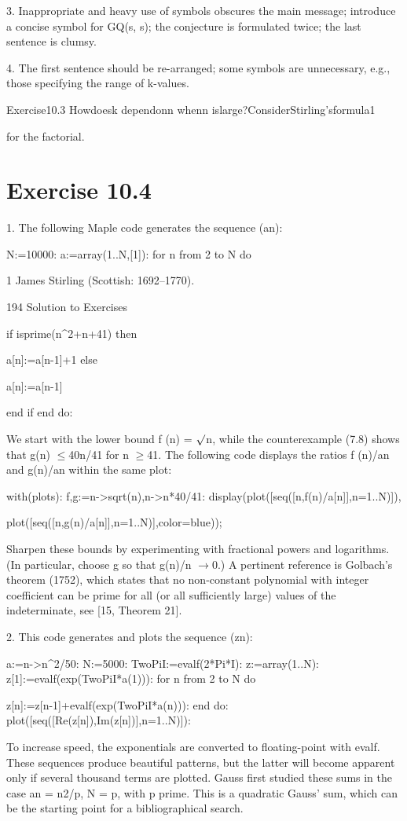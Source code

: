 \documentclass[11pt]{article}
\theoremstyle{plain}
\theoremstyle{definition}
\begin{document}
3. Inappropriate and heavy use of symbols obscures the main message; introduce a concise symbol for GQ(s, s); the conjecture is formulated twice; the last sentence is clumsy.

4. The first sentence should be re-arranged; some symbols are unnecessary, e.g., those specifying the range of k-values.

Exercise10.3 Howdoesk dependonn whenn islarge?ConsiderStirling'sformula1

for the factorial.

\section{Exercise 10.4}

1. The following Maple code generates the sequence (an):

N:=10000: a:=array(1..N,[1]): for n from 2 to N do

1 James Stirling (Scottish: 1692--1770).

194 Solution to Exercises

if isprime(n\^{}2+n+41) then

a[n]:=a[n-1]+1 else

a[n]:=a[n-1]

end if end do:

We start with the lower bound f (n) = $\surd$n, while the counterexample (7.8) shows that g(n) $\leq$40n/41 for n $\geq$41. The following code displays the ratios f (n)/an and g(n)/an within the same plot:

with(plots): f,g:=n->sqrt(n),n->n*40/41: display(plot([seq([n,f(n)/a[n]],n=1..N)]),

plot([seq([n,g(n)/a[n]],n=1..N)],color=blue));

Sharpen these bounds by experimenting with fractional powers and logarithms. (In particular, choose g so that g(n)/n $\to$0.) A pertinent reference is Golbach's theorem (1752), which states that no non-constant polynomial with integer coefficient can be prime for all (or all sufficiently large) values of the indeterminate, see [15, Theorem 21].

2. This code generates and plots the sequence (zn):

a:=n->n\^{}2/50: N:=5000: TwoPiI:=evalf(2*Pi*I): z:=array(1..N): z[1]:=evalf(exp(TwoPiI*a(1))): for n from 2 to N do

z[n]:=z[n-1]+evalf(exp(TwoPiI*a(n))): end do: plot([seq([Re(z[n]),Im(z[n])],n=1..N)]):

To increase speed, the exponentials are converted to floating-point with evalf. These sequences produce beautiful patterns, but the latter will become apparent only if several thousand terms are plotted. Gauss first studied these sums in the case an = n2/p, N = p, with p prime. This is a quadratic Gauss' sum, which can be the starting point for a bibliographical search.
\end{document}
